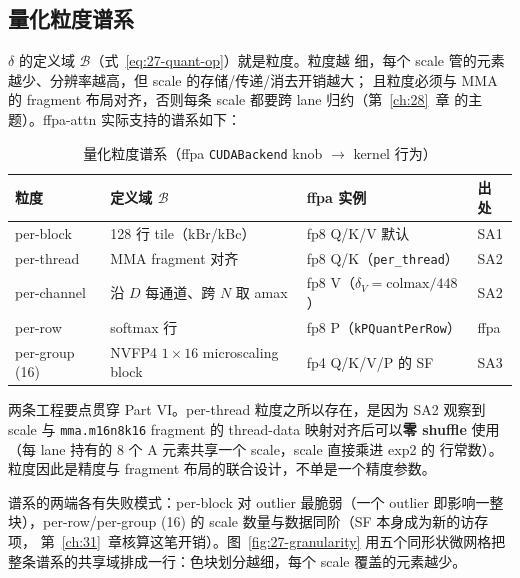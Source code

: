 \subsection{量化粒度谱系}

$\delta$ 的定义域 $\mathcal{B}$（式~\ref{eq:27-quant-op}）就是粒度。粒度越
细，每个 scale 管的元素越少、分辨率越高，但 scale 的存储/传递/消去开销越大；
且粒度必须与 MMA 的 fragment 布局对齐，否则每条 scale 都要跨 lane 归约（第~\ref{ch:28}~章
的主题）。ffpa-attn 实际支持的谱系如下：

\begin{table}[htbp]
  \centering
  \caption{量化粒度谱系（ffpa \texttt{CUDABackend} knob $\to$ kernel 行为）}
  \label{tab:27-granularity}
  \begin{tabular}{llll}
    \toprule
    粒度 & 定义域 $\mathcal{B}$ & ffpa 实例 & 出处 \\
    \midrule
    per-block & 128 行 tile（kBr/kBc） & fp8 Q/K/V 默认 & SA1 \\
    per-thread & MMA fragment 对齐 & fp8 Q/K（\texttt{per\_thread}） & SA2 \\
    per-channel & 沿 $D$ 每通道、跨 $N$ 取 amax & fp8 V（$\delta_V = \mathrm{colmax}/448$） & SA2 \\
    per-row & softmax 行 & fp8 P（\texttt{kPQuantPerRow}） & ffpa \\
    per-group (16) & NVFP4 $1\times16$ microscaling block & fp4 Q/K/V/P 的 SF & SA3 \\
    \bottomrule
  \end{tabular}
\end{table}

两条工程要点贯穿 Part VI。per-thread 粒度之所以存在，是因为 SA2 观察到
scale 与 \texttt{mma.m16n8k16} fragment 的 thread-data 映射对齐后可以\textbf{零
shuffle} 使用（每 lane 持有的 8 个 A 元素共享一个 scale，scale 直接乘进 exp2 的
行常数）。粒度因此是精度与 fragment 布局的联合设计，不单是一个精度参数。

谱系的两端各有失败模式：per-block 对 outlier 最脆弱（一个 outlier
即影响一整块），per-row/per-group (16) 的 scale 数量与数据同阶（SF 本身成为新的访存项，
第~\ref{ch:31}~章核算这笔开销）。图~\ref{fig:27-granularity} 用五个同形状微网格把
整条谱系的共享域排成一行：色块划分越细，每个 scale 覆盖的元素越少。

